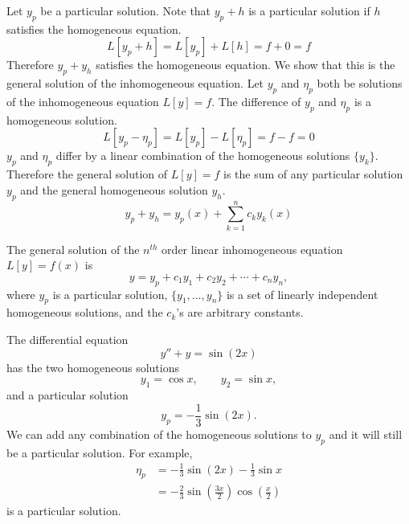 Let $y_p$ be a particular solution.  Note that $y_p + h$ is a particular 
solution if $h$ satisfies the homogeneous equation.
\[
L[y_p + h] = L[y_p] + L[h] = f + 0 = f
\]
Therefore $y_p + y_h$ satisfies the homogeneous equation.  We show that this is
the general solution of the inhomogeneous equation.
Let $y_p$ and $\eta_p$ both be solutions
of the inhomogeneous equation $L[y] = f$.  The difference of $y_p$ and
$\eta_p$ is a homogeneous solution.
\[
L[y_p - \eta_p] = L[y_p] - L[\eta_p] = f - f = 0
\]
$y_p$ and $\eta_p$ differ by a linear combination of the homogeneous solutions
$\{ y_k \}$.  Therefore the general solution of $L[y] = f$ is the sum of any 
particular solution $y_p$ and the general homogeneous solution $y_h$.
\[
y_p + y_h = y_p(x) + \sum_{k=1}^n c_k y_k(x)
\]




\begin{Result}
  The general solution of the $n^{t h}$ order linear inhomogeneous equation
  $L[y] = f(x)$ is
  \[ 
  y = y_p + c_1 y_1 + c_2 y_2 + \cdots + c_n y_n,
  \]
  where $y_p$ is a particular solution, $\{y_1, \ldots,y_n\}$ is a set of
  linearly independent homogeneous solutions, and the $c_k$'s 
  are arbitrary constants.
\end{Result}






\begin{Example}
  The differential equation 
  \[ 
  y'' + y = \sin(2 x)
  \]
  has the two homogeneous solutions
  \[ 
  y_1 = \cos x, \qquad y_2 = \sin x,
  \]
  and a particular solution
  \[ 
  y_p = -\frac{1}{3} \sin(2 x).
  \]
  We can add any combination of the homogeneous solutions to $y_p$ and it will
  still be a particular solution.  For example,
  \begin{align*}
    \eta_p &= -\frac{1}{3} \sin(2 x) - \frac{1}{3} \sin x \\
    &= -\frac{2}{3} \sin\left(\frac{3x}{2}\right)
    \cos\left(\frac{x}{2}\right)
  \end{align*}
  is a particular solution.
\end{Example}























